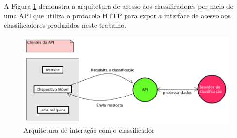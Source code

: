 A Figura \ref{fig:api} demonstra a arquitetura de acesso aos classificadores por meio de uma API que utiliza o protocolo HTTP para expor a interface de acesso aos classificadores produzidos neste trabalho.

\begin{figure}[htb]
  \caption{\label{fig:api}Arquitetura de interação com o classificador}
  \begin{center}
    \includegraphics[scale=0.7]{imagens/api-diagram.png}
  \end{center}
\end{figure}
\newpage